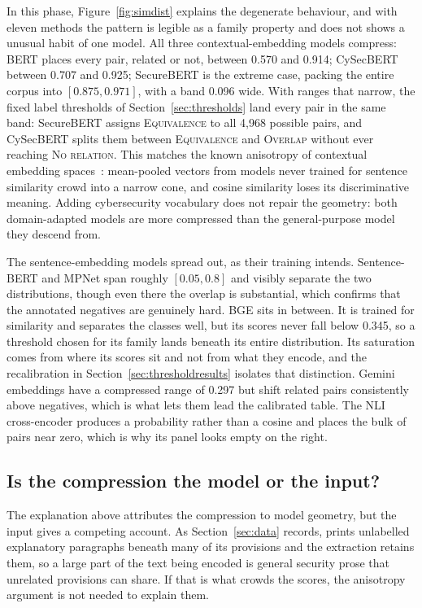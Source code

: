 In this phase, Figure~\ref{fig:simdist} explains the degenerate behaviour, and with eleven
methods the pattern is legible as a family property and does not shows a unusual habit of one model.
All three contextual-embedding models compress: BERT places every pair,
related or not, between 0.570 and 0.914; CySecBERT between 0.707 and 0.925;
SecureBERT is the extreme case, packing the entire corpus into
$[0.875, 0.971]$, with a band 0.096 wide. With ranges that narrow, the fixed label
thresholds of Section~\ref{sec:thresholds} land every pair in the same band:
SecureBERT assigns \textsc{Equivalence} to all 4{,}968 possible pairs, and
CySecBERT splits them between \textsc{Equivalence} and \textsc{Overlap} without
ever reaching \textsc{No relation}. This matches the known anisotropy of
contextual embedding spaces~\cite{ethayarajh2019contextual}: mean-pooled vectors
from models never trained for sentence similarity crowd into a narrow cone, and
cosine similarity loses its discriminative meaning. Adding cybersecurity
vocabulary does not repair the geometry: both domain-adapted models are more
compressed than the general-purpose model they descend from.

The sentence-embedding models spread out, as their training intends.
Sentence-BERT and MPNet span roughly $[0.05, 0.8]$ and visibly separate the two
distributions, though even there the overlap is substantial, which confirms that
the annotated negatives are genuinely hard. BGE sits in between. It is trained for
similarity and separates the classes well, but its scores never fall below 0.345,
so a threshold chosen for its family lands beneath its entire distribution. Its
saturation comes from where its scores sit and not from what they encode, and the
recalibration in Section~\ref{sec:thresholdresults} isolates that distinction.
Gemini embeddings have a compressed range of 0.297 but shift related pairs
consistently above negatives, which is what lets them lead the calibrated table.
The NLI cross-encoder produces a probability rather than a cosine and places the
bulk of pairs near zero, which is why its panel looks empty on the right.

\subsection*{Is the compression the model or the input?}\label{sec:ablation}

The explanation above attributes the compression to model geometry, but the input
gives a competing account. As Section~\ref{sec:data} records, \standardA{} prints
unlabelled explanatory paragraphs beneath many of its provisions and the
extraction retains them, so a large part of the text being encoded is general
security prose that unrelated provisions can share. If that is what crowds the
scores, the anisotropy argument is not needed to explain them.

